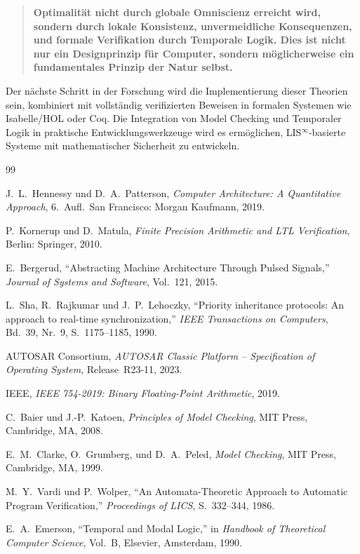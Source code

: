\documentclass[a4paper,12pt]{article}
\theoremstyle{definition}
\begin{document}
	\begin{quote}
		\textbf{Optimalität nicht durch globale Omniscienz erreicht wird, sondern durch lokale Konsistenz, unvermeidliche Konsequenzen, und formale Verifikation durch Temporale Logik. Dies ist nicht nur ein Designprinzip für Computer, sondern möglicherweise ein fundamentales Prinzip der Natur selbst.}
	\end{quote}
	
	Der nächste Schritt in der Forschung wird die Implementierung dieser Theorien sein, kombiniert mit vollständig verifizierten Beweisen in formalen Systemen wie Isabelle/HOL oder Coq. Die Integration von Model Checking und Temporaler Logik in praktische Entwicklungswerkzeuge wird es ermöglichen, LIS$^{\infty}$-basierte Systeme mit mathematischer Sicherheit zu entwickeln.
	
	\begin{thebibliography}{99}
		
		J.~L.\ Hennessy und D.~A.\ Patterson,
		\textit{Computer Architecture: A Quantitative Approach},
		6.~Aufl.\ San Francisco: Morgan Kaufmann, 2019.
		
		P.~Kornerup und D.~Matula,
		\textit{Finite Precision Arithmetic and LTL Verification},
		Berlin: Springer, 2010.
		
		E.~Bergerud,
		``Abstracting Machine Architecture Through Pulsed Signals,''
		\textit{Journal of Systems and Software}, Vol.~121, 2015.
		
		L.~Sha, R.~Rajkumar und J.~P.~Lehoczky,
		``Priority inheritance protocols: An approach to real-time synchronization,''
		\textit{IEEE Transactions on Computers}, Bd.~39, Nr.~9, S.~1175--1185, 1990.
		
		AUTOSAR Consortium,
		\textit{AUTOSAR Classic Platform -- Specification of Operating System},
		Release~R23-11, 2023.
		
		IEEE,
		\textit{IEEE 754-2019: Binary Floating-Point Arithmetic},
		2019.
		
		C.~Baier und J.-P.~Katoen,
		\textit{Principles of Model Checking},
		MIT Press, Cambridge, MA, 2008.
		
		E.~M.\ Clarke, O.~Grumberg, und D.~A.\ Peled,
		\textit{Model Checking},
		MIT Press, Cambridge, MA, 1999.
		
		M.~Y.\ Vardi und P.~Wolper,
		``An Automata-Theoretic Approach to Automatic Program Verification,''
		\textit{Proceedings of LICS}, S.~332--344, 1986.
		
		E.~A.\ Emerson,
		``Temporal and Modal Logic,''
		in \textit{Handbook of Theoretical Computer Science}, Vol.~B, Elsevier, Amsterdam, 1990.
		
	\end{thebibliography}
	
\end{document}
